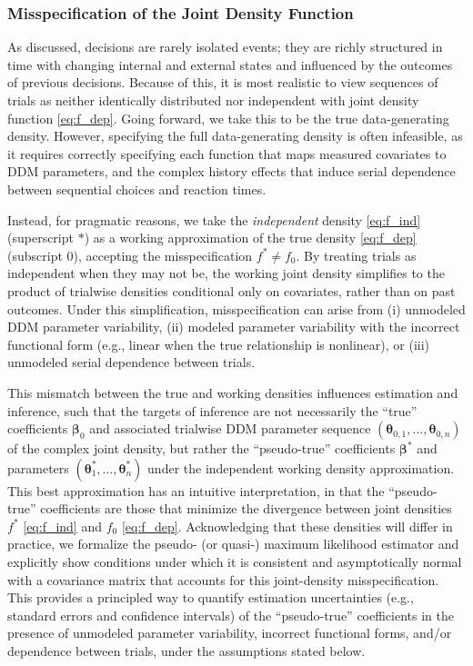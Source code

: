 \documentclass[00-main.tex]{subfiles}
\begin{document}
\subsubsection{Misspecification of the Joint Density Function}\label{sec:misspecification}
As discussed, decisions are rarely isolated events; they are richly structured in time with changing internal and external states and influenced by the outcomes of previous decisions. Because of this, it is most realistic to view sequences of trials as neither identically distributed nor independent with joint density function \eqref{eq:f_dep}. Going forward, we take this to be the true data-generating density. However, specifying the full data-generating density is often infeasible, as it requires correctly specifying each function that maps measured covariates to DDM parameters, and the complex history effects that induce serial dependence between sequential choices and reaction times.

Instead, for pragmatic reasons, we take the \emph{independent} density \eqref{eq:f_ind} (superscript $*$) as a working approximation of the true density \eqref{eq:f_dep} (subscript $0$), accepting the misspecification $f^* \neq f_0$. By treating trials as independent when they may not be, the working joint density simplifies to the product of trialwise densities conditional only on covariates, rather than on past outcomes. Under this simplification, misspecification can arise from (i) unmodeled DDM parameter variability, (ii) modeled parameter variability with the incorrect functional form (e.g., linear when the true relationship is nonlinear), or (iii) unmodeled serial dependence between trials.

This mismatch between the true and working densities influences estimation and inference, such that the targets of inference are not necessarily the ``true'' coefficients $\bm{\beta}_0$ and associated trialwise DDM parameter sequence $(\bm{\theta}_{0,1}, \dots, \bm{\theta}_{0,n})$ of the complex joint density, but rather the ``pseudo-true'' coefficients $\bm{\beta}^*$ and parameters $(\bm{\theta}^*_1, \dots, \bm{\theta}^*_n)$ under the independent working density approximation. This best approximation has an intuitive interpretation, in that the ``pseudo-true'' coefficients are those that minimize the divergence between joint densities $f^*$ \eqref{eq:f_ind} and $f_0$ \eqref{eq:f_dep}. Acknowledging that these densities will differ in practice, we formalize the pseudo- (or quasi-) maximum likelihood estimator and explicitly show conditions under which it is consistent and asymptotically normal with a covariance matrix that accounts for this joint-density misspecification. This provides a principled way to quantify estimation uncertainties (e.g., standard errors and confidence intervals) of the ``pseudo-true'' coefficients in the presence of unmodeled parameter variability, incorrect functional forms, and/or dependence between trials, under the assumptions stated below.
\end{document}
